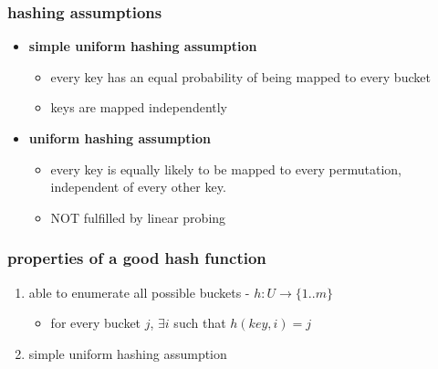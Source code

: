 \documentclass{article}
\begin{document}
\begin{multicols*}{3}
    \subsubsection{hashing assumptions}
    \begin{itemize}
        \item \textbf{simple uniform hashing assumption}
              \begin{itemize}
                  \item every key has an equal probability of being mapped to every bucket
                  \item keys are mapped independently
              \end{itemize}
        \item \textbf{uniform hashing assumption}
              \begin{itemize}
                  \item every key is equally likely to be mapped to every permutation, independent of every other key.
                  \item NOT fulfilled by linear probing
              \end{itemize}
    \end{itemize}

    \subsubsection{properties of a good hash function}
    \begin{enumerate}
        \item able to enumerate all possible buckets - $h:U \to \{1..m\}$
              \begin{itemize}
                  \item for every bucket $j$, $\exists i$ such that $h(key, i) = j$
              \end{itemize}
        \item simple uniform hashing assumption
    \end{enumerate}


\end{multicols*}
\end{document}
